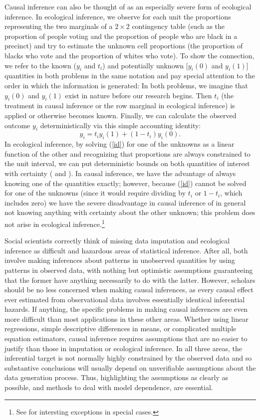 \documentclass[11pt,titlepage]{article}
\begin{document}
Causal inference can also be thought of as an especially severe form
of ecological inference.  In ecological inference, we observe for each
unit the proportions representing the two marginals of a $2\times 2$
contingency table (such as the proportion of people voting and the
proportion of people who are black in a precinct) and try to estimate
the unknown cell proportions (the proportion of blacks who vote and
the proportion of whites who vote).  To show the connection, we refer
to the known ($y_i$ and $t_i$) and potentially unknown [$y_i(0)$ and
$y_i(1)$] quantities in both problems in the same notation and pay
special attention to the order in which the information is generated:
In both problems, we imagine that $y_i(0)$ and $y_i(1)$ exist in
nature before our research begins.  Then $t_i$ (the treatment in
causal inference or the row marginal in ecological inference) is
applied or otherwise becomes known.  Finally, we can calculate the
observed outcome $y_i$ deterministically via this simple accounting
identity:
\begin{equation}
  \label{id}
  y_i = t_iy_i(1) + (1-t_i)y_i(0).
\end{equation}
In ecological inference, by solving (\ref{id}) for one of the unknowns
as a linear function of the other and recognizing that proportions are
always constrained to the unit interval, we can put deterministic
bounds on both quantities of interest with certainty
(\citealp{DunDav53} and \citealp[][ch.5]{King97}).  In causal
inference, we have the advantage of always knowing one of the
quantities exactly; however, because (\ref{id}) cannot be solved for
one of the unknowns (since it would require dividing by $t_i$ or
$1-t_i$, which includes zero) we have the severe disadvantage in
causal inference of in general not knowing anything with certainty
about the other unknown; this problem does not arise in ecological
inference.\footnote{See \citet{Manski95} for intersting exceptions in
  special cases.}

Social scientists correctly think of missing data imputation and
ecological inference as difficult and hazardous areas of statistical
inference.  After all, both involve making inferences about patterns
in unobserved quantities by using patterns in observed data, with
nothing but optimistic assumptions guaranteeing that the former have
anything necessarily to do with the latter.  However, scholars should
be no less concerned when making causal inferences, as every causal
effect ever estimated from observational data involves essentially
identical inferential hazards.  If anything, the specific problems in
making causal inferences are even more difficult than most
applications in these other areas.  Whether using linear regressions,
simple descriptive differences in means, or complicated multiple
equation estimators, causal inference requires assumptions that are no
easier to justify than those in imputation or ecological inference.
In all three areas, the inferential target is not normally highly
constrained by the observed data and so substantive conclusions will
usually depend on unverifiable assumptions about the data generation
process.  Thus, highlighting the assumptions as clearly as possible,
and methods to deal with model dependence, are essential.
\end{document}
